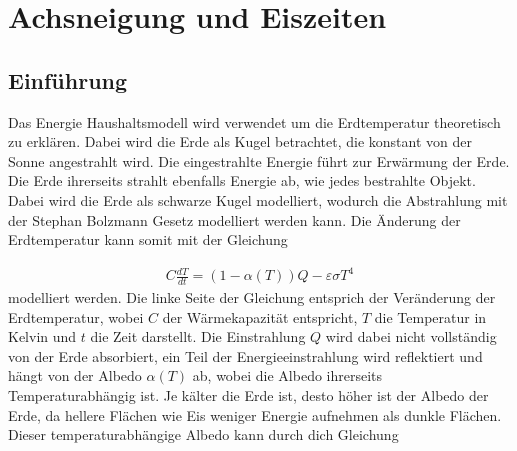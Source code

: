 %
%
%
\chapter{Achsneigung und Eiszeiten\label{chapter:neigung}}
\begin{refsection}

\section{Einführung}\label{sec:einf} 
Das Energie Haushaltsmodell wird verwendet um die Erdtemperatur theoretisch zu erklären. Dabei wird die Erde als Kugel betrachtet, die konstant von der Sonne angestrahlt wird. Die eingestrahlte Energie führt zur Erwärmung der Erde. Die Erde ihrerseits strahlt ebenfalls Energie ab, wie jedes bestrahlte Objekt. Dabei wird die Erde als schwarze Kugel modelliert, wodurch die Abstrahlung mit der Stephan Bolzmann Gesetz modelliert werden kann. Die Änderung der Erdtemperatur kann somit mit der Gleichung 

\begin{eqnarray}
\label{eq1}
C \frac{d T}{d t} = (1-\alpha(T)) Q- \varepsilon \sigma T^4
\end{eqnarray}
modelliert werden. Die linke Seite der Gleichung entsprich der Veränderung der Erdtemperatur, wobei $C$ der Wärmekapazität entspricht, $T$ die Temperatur in Kelvin und $t$ die Zeit darstellt. Die Einstrahlung $Q$ wird dabei nicht vollständig von der Erde absorbiert, ein Teil der Energieeinstrahlung wird reflektiert und hängt von der Albedo $\alpha(T)$ ab, wobei die Albedo ihrerseits Temperaturabhängig ist. Je kälter die Erde ist, desto höher ist der Albedo der Erde, da hellere Flächen wie Eis weniger Energie aufnehmen als dunkle Flächen. Dieser temperaturabhängige Albedo kann durch dich Gleichung 


\end{refsection}
